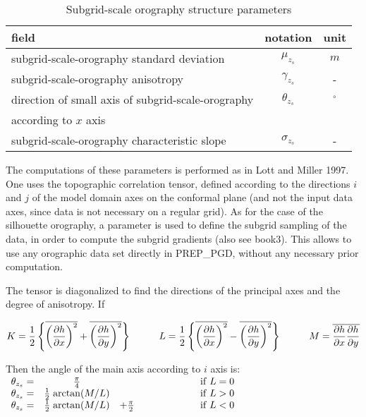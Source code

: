 \begin{table}[h]
\hspace*{2.cm}
\begin{tabular}{||l|c|c||}
\hline
\hline
field & notation &  unit \\
\hline
\hline
subgrid-scale-orography standard deviation &$\mu_{z_s}$&$m$\\
\hline
subgrid-scale-orography anisotropy&$\gamma_{z_s}$&-\\
\hline
direction of small axis of subgrid-scale-orography
&$\theta_{z_s}$&$^\circ$\\
 according to $x$ axis
&&\\
\hline
subgrid-scale-orography characteristic slope&$\sigma_{z_s}$&-\\
\hline
\hline
\end{tabular}
\caption{Subgrid-scale orography structure parameters
\label{paramSSO}}
\end{table}

The computations of these parameters is performed as
in Lott and Miller 1997. One uses the topographic correlation tensor,
defined according to the directions $i$ and $j$ of
the model domain axes on the conformal
plane (and not the input data axes, since data is not necessary
on a regular grid). As for the case of the silhouette orography,
a parameter is used to define the subgrid sampling
of the data, in order to compute the subgrid gradients (also see book3).
This allows to use any orographic data set directly in PREP\_PGD,
without any necessary prior computation.

The tensor is diagonalized to find the directions of the principal axes
and the degree of anisotropy. If

\begin{displaymath}
K=\frac{1}{2} \left\{ \overline{\left(\frac{\partial h}{\partial x}\right)^2}
+ \overline{\left(\frac{\partial h}{\partial y}\right)^2} \right\}
\hspace*{1.cm}
L = \frac{1}{2} \left\{ \overline{\left(\frac{\partial h}{\partial x}\right)^2}
- \overline{\left(\frac{\partial h}{\partial y}\right)^2} \right\}
\hspace*{1.cm}
M = \overline{\frac{\partial h}{\partial x}\frac{\partial h}{\partial y}}
\end{displaymath}

Then the angle of the main axis according to $i$ axis is:\\

$
\begin{array}{lcll}
\theta_{z_s} =& \frac{\pi}{4}                  &                 &\hspace*{2.cm} {\rm if} \; L=0\\
\theta_{z_s} =& \frac{1}{2} \; {\rm arctan} (M/L) &                 &\hspace*{2.cm} {\rm if} \; L>0\\
\theta_{z_s} =& \frac{1}{2} \; {\rm arctan} (M/L) & + \frac{\pi}{2 }&\hspace*{2.cm} {\rm if} \; L<0\\
&&&\\
&&&\\
\end{array}
$

